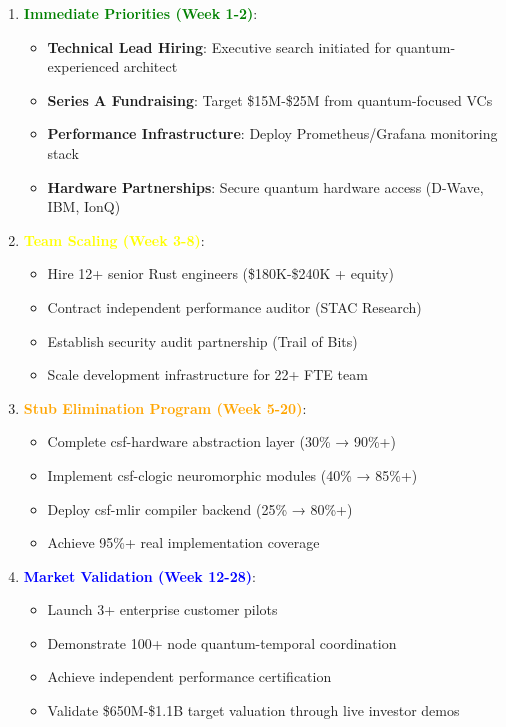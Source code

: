 \documentclass{article}
\begin{document}
\begin{enumerate}
    \item \textcolor{green}{\textbf{Immediate Priorities (Week 1-2)}}:
    \begin{itemize}
        \item \textbf{Technical Lead Hiring}: Executive search initiated for quantum-experienced architect
        \item \textbf{Series A Fundraising}: Target \$15M-\$25M from quantum-focused VCs
        \item \textbf{Performance Infrastructure}: Deploy Prometheus/Grafana monitoring stack
        \item \textbf{Hardware Partnerships}: Secure quantum hardware access (D-Wave, IBM, IonQ)
    \end{itemize}
    \item \textcolor{yellow}{\textbf{Team Scaling (Week 3-8)}}:
    \begin{itemize}
        \item Hire 12+ senior Rust engineers (\$180K-\$240K + equity)
        \item Contract independent performance auditor (STAC Research)
        \item Establish security audit partnership (Trail of Bits)
        \item Scale development infrastructure for 22+ FTE team
    \end{itemize}
    \item \textcolor{orange}{\textbf{Stub Elimination Program (Week 5-20)}}:
    \begin{itemize}
        \item Complete csf-hardware abstraction layer (30\% → 90\%+)
        \item Implement csf-clogic neuromorphic modules (40\% → 85\%+)
        \item Deploy csf-mlir compiler backend (25\% → 80\%+)
        \item Achieve 95\%+ real implementation coverage
    \end{itemize}
    \item \textcolor{blue}{\textbf{Market Validation (Week 12-28)}}:
    \begin{itemize}
        \item Launch 3+ enterprise customer pilots
        \item Demonstrate 100+ node quantum-temporal coordination
        \item Achieve independent performance certification
        \item Validate \$650M-\$1.1B target valuation through live investor demos
    \end{itemize}
\end{enumerate}
\end{document}
